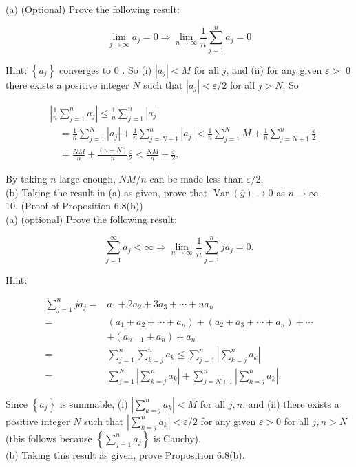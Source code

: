\documentclass[10pt]{article}
\begin{document}
(a) (Optional) Prove the following result:

$$
\lim _{j \rightarrow \infty} a_{j}=0 \Rightarrow \lim _{n \rightarrow \infty} \frac{1}{n} \sum_{j=1}^{n} a_{j}=0
$$

Hint: $\left\{a_{j}\right\}$ converges to 0 . So (i) $\left|a_{j}\right|<M$ for all $j$, and (ii) for any given $\varepsilon>$ 0 there exists a positive integer $N$ such that $\left|a_{j}\right|<\varepsilon / 2$ for all $j>N$. So

$$
\begin{aligned}
& \left|\frac{1}{n} \sum_{j=1}^{n} a_{j}\right| \leq \frac{1}{n} \sum_{j=1}^{n}\left|a_{j}\right| \\
& \quad=\frac{1}{n} \sum_{j=1}^{N}\left|a_{j}\right|+\frac{1}{n} \sum_{j=N+1}^{n}\left|a_{j}\right|<\frac{1}{n} \sum_{j=1}^{N} M+\frac{1}{n} \sum_{j=N+1}^{n} \frac{\varepsilon}{2} \\
& \quad=\frac{N M}{n}+\frac{(n-N)}{n} \frac{\varepsilon}{2}<\frac{N M}{n}+\frac{\varepsilon}{2} .
\end{aligned}
$$

By taking $n$ large enough, $N M / n$ can be made less than $\varepsilon / 2$.\\
(b) Taking the result in (a) as given, prove that $\operatorname{Var}(\bar{y}) \rightarrow 0$ as $n \rightarrow \infty$.\\
10. (Proof of Proposition 6.8(b))\\
(a) (optional) Prove the following result:

$$
\sum_{j=1}^{\infty} a_{j}<\infty \Rightarrow \lim _{n \rightarrow \infty} \frac{1}{n} \sum_{j=1}^{n} j a_{j}=0 .
$$

Hint:

$$
\begin{aligned}
\sum_{j=1}^{n} j a_{j}= & a_{1}+2 a_{2}+3 a_{3}+\cdots+n a_{n} \\
= & \left(a_{1}+a_{2}+\cdots+a_{n}\right)+\left(a_{2}+a_{3}+\cdots+a_{n}\right)+\cdots \\
& +\left(a_{n-1}+a_{n}\right)+a_{n} \\
= & \sum_{j=1}^{n} \sum_{k=j}^{n} a_{k} \leq \sum_{j=1}^{n}\left|\sum_{k=j}^{n} a_{k}\right| \\
= & \sum_{j=1}^{N}\left|\sum_{k=j}^{n} a_{k}\right|+\sum_{j=N+1}^{n}\left|\sum_{k=j}^{n} a_{k}\right| .
\end{aligned}
$$

Since $\left\{a_{j}\right\}$ is summable, (i) $\left|\sum_{k=j}^{n} a_{k}\right|<M$ for all $j, n$, and (ii) there exists a positive integer $N$ such that $\left|\sum_{k=j}^{n} a_{k}\right|<\varepsilon / 2$ for any given $\varepsilon>0$ for all $j, n>N$ (this follows because $\left\{\sum_{j=1}^{n} a_{j}\right\}$ is Cauchy).\\
(b) Taking this result as given, prove Proposition 6.8(b).
\end{document}
